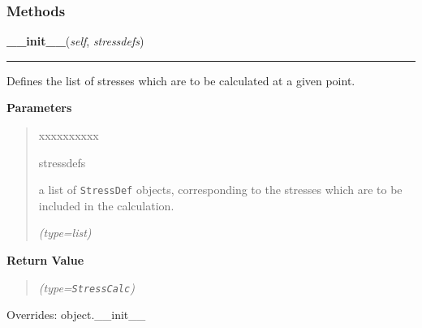   \subsubsection{Methods}

    \vspace{0.5ex}

\hspace{.8\funcindent}\begin{boxedminipage}{\funcwidth}

    \raggedright \textbf{\_\_init\_\_}(\textit{self}, \textit{stressdefs})

    \vspace{-1.5ex}

    \rule{\textwidth}{0.5\fboxrule}
\setlength{\parskip}{2ex}
    Defines the list of stresses which are to be calculated at a given 
    point.

\setlength{\parskip}{1ex}
      \textbf{Parameters}
      \vspace{-1ex}

      \begin{quote}
        \begin{Ventry}{xxxxxxxxxx}

          \item[stressdefs]

          a list of \texttt{StressDef} objects, corresponding to the 
          stresses which are to be included in the calculation.

            {\it (type=list)}

        \end{Ventry}

      \end{quote}

      \textbf{Return Value}
    \vspace{-1ex}

      \begin{quote}
      {\it (type=\texttt{StressCalc})}

      \end{quote}

      Overrides: object.\_\_init\_\_

    \end{boxedminipage}

    \label{SatStress:SatStress:StressCalc:tensor}

